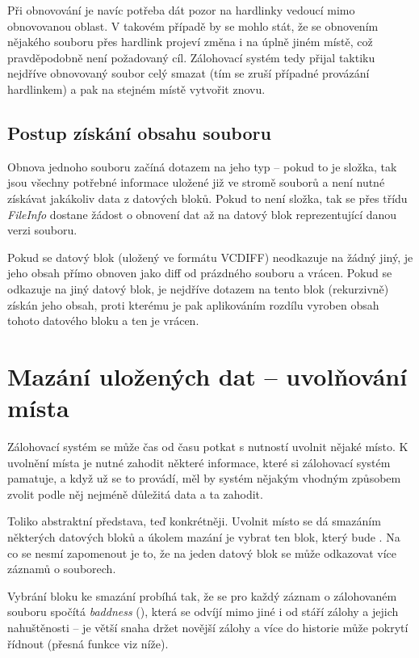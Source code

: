 Při obnovování je navíc potřeba dát pozor na hardlinky vedoucí mimo obnovovanou
oblast. V takovém případě by se mohlo stát, že se obnovením nějakého souboru
přes hardlink projeví změna i na úplně jiném místě, což pravděpodobně není
požadovaný cíl. Zálohovací systém tedy přijal taktiku nejdříve obnovovaný soubor
celý smazat (tím se zruší případné provázání hardlinkem) a pak na stejném místě
vytvořit znovu.

\subsection{Postup získání obsahu souboru}

Obnova jednoho souboru začíná dotazem na jeho typ -- pokud to je složka, tak
jsou všechny potřebné informace uložené již ve stromě souborů a není nutné
získávat jakákoliv data z datových bloků. Pokud to není složka, tak se přes
třídu {\it FileInfo} dostane žádost o obnovení dat až na datový blok
reprezentující danou verzi souboru.

Pokud se datový blok (uložený ve formátu \gls{VCDIFF}) neodkazuje na žádný jiný,
je jeho obsah přímo obnoven jako diff od prázdného souboru a vrácen. Pokud se
odkazuje na jiný datový blok, je nejdříve dotazem na tento blok (rekurzivně)
získán jeho obsah, proti kterému je pak aplikováním rozdílu vyroben obsah tohoto
datového bloku a ten je vrácen.

\section{Mazání uložených dat -- uvolňování místa}

Zálohovací systém se může čas od času potkat s nutností uvolnit nějaké místo.
K uvolnění místa je nutné zahodit některé informace, které si zálohovací systém
pamatuje, a když už se to provádí, měl by systém nějakým vhodným způsobem zvolit
podle něj nejméně důležitá data a ta zahodit.

Toliko abstraktní představa, teď konkrétněji. Uvolnit místo se dá smazáním
některých datových bloků a úkolem mazání je vybrat ten blok, který bude
. Na co se nesmí zapomenout je to, že na jeden datový blok
se může odkazovat více záznamů o souborech.

Vybrání bloku ke smazání probíhá tak, že se pro každý záznam o zálohovaném
souboru spočítá {\it baddness} (), která se odvíjí mimo jiné
i od stáří zálohy a jejich nahuštěnosti -- je větší snaha držet novější zálohy
a více do historie může pokrytí řídnout (přesná funkce viz níže).

